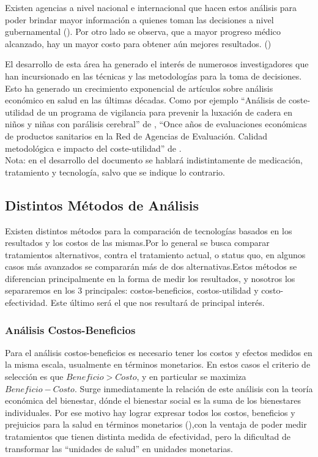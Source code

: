 \documentclass{siep}
\begin{document}
Existen agencias a nivel nacional e internacional que hacen estos análisis para poder brindar mayor información a quienes toman las decisiones a nivel gubernamental (\cite{zarate_evaluaciones_2010}). Por otro lado se observa, que a mayor progreso médico alcanzado, hay un mayor costo para obtener aún mejores resultados. (\cite{sacristan_evaluacion_nodate})


El desarrollo de esta área ha generado el interés de numerosos investigadores que han incursionado en las técnicas y las metodologías para la toma de decisiones. Esto ha generado un crecimiento exponencial de artículos sobre análisis económico en salud en las últimas décadas. Como por ejemplo ``Análisis de coste-utilidad de un programa de vigilancia para prevenir la luxación de cadera en niños y niñas con parálisis cerebral'' de \cite{vallejo-torres_cost-effectiveness_2021}, ``Once años de evaluaciones económicas de productos sanitarios en la Red de Agencias de Evaluación. Calidad metodológica e impacto del coste-utilidad'' de \cite{gimenez_once_2021}.\\


Nota: en el desarrollo del documento se hablará indistintamente de medicación, tratamiento y tecnología, salvo que se indique lo contrario.

\subsection{Distintos Métodos de An\'alisis}
\label{sec:DMA}
Existen distintos métodos para la comparación de tecnologías basados en los resultados y los costos de las mismas.Por lo general se busca comparar tratamientos alternativos, contra el tratamiento actual, o status quo, en algunos casos más avanzados se comparar\'an más de dos alternativas.Estos métodos se diferencian principalmente en la forma de medir los resultados, y nosotros los separaremos en los 3 principales: costos-beneficios, costos-utilidad y costo-efectividad. Este último será el que nos resultará de principal interés.

\subsubsection{Análisis Costos-Beneficios}
\label{sec:ACB}
Para el análisis costos-beneficios es necesario tener los costos y efectos medidos en la misma escala, usualmente en términos monetarios.
En estos casos el criterio de selección es que $Beneficio > Costo$, y en particular se maximiza $Beneficio-Costo$. Surge inmediatamente la relación de este análisis con la teoría económica del bienestar, dónde el bienestar social es la suma de los bienestares individuales. Por ese motivo hay lograr expresar todos los costos, beneficios y prejuicios para la salud en términos monetarios (\cite{baio_bayesian_nodate}),con la ventaja de poder medir tratamientos que tienen distinta medida de efectividad, pero la dificultad de transformar las ``unidades de salud'' en unidades monetarias.
\end{document}
